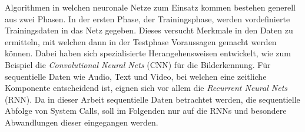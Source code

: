        Algorithmen in welchen neuronale Netze zum Einsatz kommen bestehen generell aus zwei Phasen. 
        In der ersten Phase, der Trainingsphase, werden vordefinierte Trainingsdaten in das Netz gegeben.
        Dieses versucht Merkmale in den Daten zu ermitteln, mit welchen dann in der Testphase Voraussagen gemacht werden können.
        Dabei haben sich spezialisierte Herangehensweisen entwickelt, wie zum Beispiel die \textit{Convolutional Neural Nets} (CNN) für die Bilderkennung. 
        Für sequentielle Daten wie Audio, Text und Video, bei welchen eine zeitliche Komponente entscheidend ist, eignen sich vor allem die \textit{Recurrent Neural Nets} (RNN).
        Da in dieser Arbeit sequentielle Daten betrachtet werden, die sequentielle Abfolge von System Calls, soll im Folgenden nur auf die RNNs und besondere Abwandlungen dieser eingegangen werden.
        
        
%
